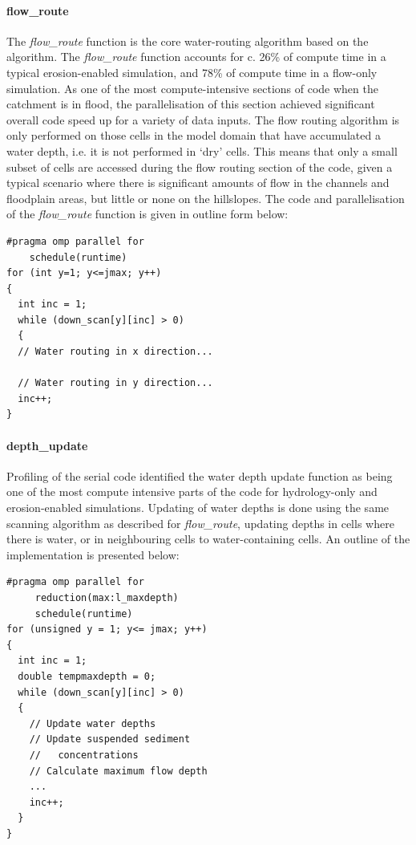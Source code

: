 \paragraph*{flow\_route}
The \textit{flow\_route} function is the core water-routing algorithm based on the \citet{bates2010simple} algorithm. The \textit{flow\_route} function accounts for c. 26\% of compute time in a typical erosion-enabled simulation, and 78\% of compute time in a flow-only simulation.  As one of the most compute-intensive sections of code when the catchment is in flood, the parallelisation of this section achieved significant overall code speed up for a variety of data inputs. The flow routing algorithm is only performed on those cells in the model domain that have accumulated a water depth, i.e. it is not performed in `dry' cells. This means that only a small subset of cells are accessed during the flow routing section of the code, given a typical scenario where there is significant amounts of flow in the channels and floodplain areas, but little or none on the hillslopes. The code and parallelisation of the \textit{flow\_route} function is given in outline form below:

\begin{verbatim}
#pragma omp parallel for
    schedule(runtime)
for (int y=1; y<=jmax; y++)
{
  int inc = 1;
  while (down_scan[y][inc] > 0)
  {
  // Water routing in x direction...
  
  // Water routing in y direction...
  inc++;
}
\end{verbatim}

\paragraph*{depth\_update}
Profiling of the serial code identified the water depth update function as being one of the most compute intensive parts of the code for hydrology-only and erosion-enabled simulations. Updating of water depths is done using the same scanning algorithm as described for \textit{flow\_route}, updating depths in cells where there is water, or in neighbouring cells to water-containing cells. An outline of the implementation is presented below:

\begin{verbatim}
#pragma omp parallel for 
     reduction(max:l_maxdepth)
     schedule(runtime)
for (unsigned y = 1; y<= jmax; y++)
{
  int inc = 1;
  double tempmaxdepth = 0;
  while (down_scan[y][inc] > 0)
  {
    // Update water depths
    // Update suspended sediment 
    //   concentrations
    // Calculate maximum flow depth
    ...
    inc++;
  }
}
\end{verbatim}

